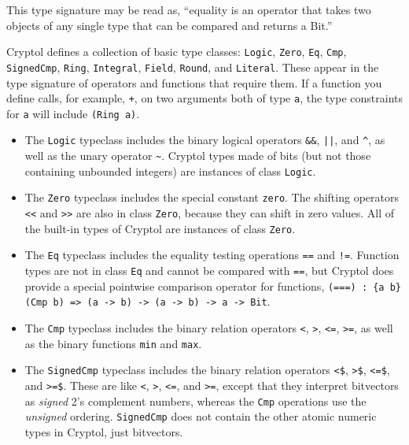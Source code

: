 This type signature may be read as, ``equality is an operator that
takes two objects of any single type that can be compared and returns
a Bit.''

Cryptol defines a collection of basic type classes: \texttt{Logic},
\texttt{Zero}, \texttt{Eq}, \texttt{Cmp}, \texttt{SignedCmp}, \texttt{Ring},
\texttt{Integral}, \texttt{Field}, \texttt{Round}, and
\texttt{Literal}. These appear in the type signature of operators and
functions that require them. If a function you define calls, for
example, \texttt{+}, on two arguments both of type \texttt{a}, the
type constraints for \texttt{a} will include \texttt{(Ring a)}.

\begin{itemize}
\item
The \texttt{Logic} typeclass includes the binary logical operators
\texttt{\&\&}, \texttt{||}, and \verb+^+, as well as the unary
operator \verb+~+. Cryptol types made of bits (but not those
containing unbounded integers) are instances of class \texttt{Logic}.

\item
The \texttt{Zero} typeclass includes the special constant
\texttt{zero}. The shifting operators \texttt{<<} and \texttt{>>} are
also in class \texttt{Zero}, because they can shift in zero values.
All of the built-in types of Cryptol are instances of class
\texttt{Zero}.

\item
The \texttt{Eq} typeclass includes the equality testing operations
\texttt{==} and \texttt{!=}. Function types are not in class \texttt{Eq}
and cannot be compared with \texttt{==}, but Cryptol does provide a
special pointwise comparison operator for functions, \texttt{(===) :
  \{a b\} (Cmp b) => (a -> b) -> (a -> b) -> a -> Bit}.

\item
The \texttt{Cmp} typeclass includes the binary relation operators
\texttt{<}, \texttt{>}, \texttt{<=}, \texttt{>=}, as well as the
binary functions \texttt{min} and \texttt{max}.

\item
The \texttt{SignedCmp} typeclass includes the binary relation
operators \texttt{<\$}, \texttt{>\$}, \texttt{<=\$}, and
\texttt{>=\$}. These are like \texttt{<}, \texttt{>}, \texttt{<=}, and
\texttt{>=}, except that they interpret bitvectors as \emph{signed}
2's complement numbers, whereas the \texttt{Cmp} operations use the
\emph{unsigned} ordering. \texttt{SignedCmp} does not contain the
other atomic numeric types in Cryptol, just bitvectors.


\end{itemize}
